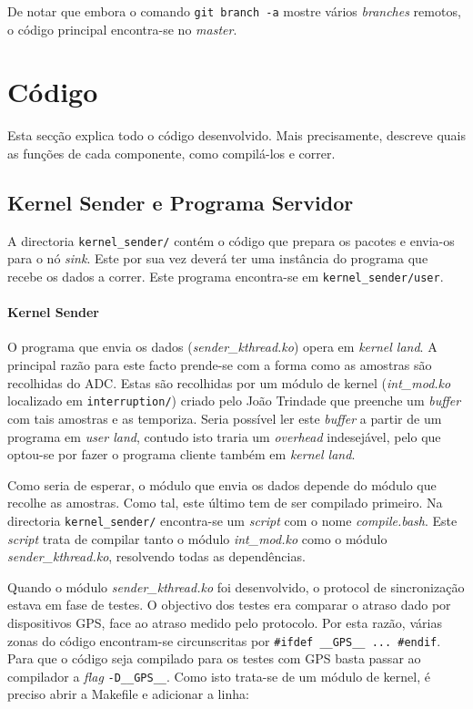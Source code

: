 \documentclass[10pt,a4paper,oneside]{book}
\begin{document}
De notar que embora o comando {\tt git branch -a} mostre vários \emph{branches} remotos, o código principal encontra-se no \emph{master}.

\chapter{Código}

 Esta secção explica todo o código desenvolvido. Mais precisamente, descreve quais as funções de cada componente, como compilá-los e correr.

  \section{Kernel Sender e Programa Servidor}
  
  A directoria {\tt kernel\_sender/} contém o código que prepara os pacotes e envia-os para o nó \emph{sink}. Este por sua vez deverá ter uma instância do programa que recebe os dados a correr. Este programa encontra-se em {\tt kernel\_sender/user}.

  \subsubsection{Kernel Sender}\label{sec:sender}

    O programa que envia os dados (\emph{sender\_kthread.ko}) opera em \emph{kernel land}. A principal razão para este facto prende-se com a forma como as amostras são recolhidas do ADC. Estas são recolhidas por um módulo de kernel (\emph{int\_mod.ko} localizado em {\tt interruption/}) criado pelo João Trindade que preenche um \emph{buffer} com tais amostras e as temporiza. Seria possível ler este \emph{buffer} a partir de um programa em \emph{user land}, contudo isto traria um \emph{overhead} indesejável, pelo que optou-se por fazer o programa cliente também em \emph{kernel land}.

    Como seria de esperar, o módulo que envia os dados depende do módulo que recolhe as amostras. Como tal, este último tem de ser compilado primeiro. Na directoria {\tt kernel\_sender/} encontra-se um \emph{script} com o nome \emph{compile.bash}. Este \emph{script} trata de compilar tanto o módulo \emph{int\_mod.ko} como o módulo \emph{sender\_kthread.ko}, resolvendo todas as dependências.

    Quando o módulo \emph{sender\_kthread.ko} foi desenvolvido, o protocol de sincronização estava em fase de testes. O objectivo dos testes era comparar o atraso dado por dispositivos GPS, face ao atraso medido pelo protocolo. Por esta razão, várias zonas do código encontram-se circunscritas por {\tt \#ifdef \_\_GPS\_\_ ... \#endif}. Para que o código seja compilado para os testes com GPS basta passar ao compilador a \emph{flag} {\tt -D\_\_GPS\_\_}. Como isto trata-se de um módulo de kernel, é preciso abrir a Makefile e adicionar a linha:
\end{document}
